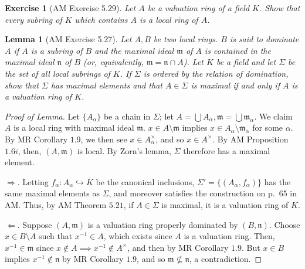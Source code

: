 \documentclass[12pt,letterpaper]{article}
\newtheorem{problem}{Exercise}[section]
\newtheorem*{lemma*}{Lemma}
\theoremstyle{definition}
\theoremstyle{remark}
\numberwithin{figure}{problem}
\numberwithin{equation}{section}
\begin{document}
\begin{problem}[AM Exercise 5.29]
  Let $A$ be a valuation ring of a field $K$. Show that every subring of $K$ which contains $A$ is a local ring of $A$.
\end{problem}
\begin{lemma*}[AM Exercise 5.27]
  Let $A,B$ be two local rings. $B$ is said to \emph{dominate} $A$ if $A$ is a subring of $B$ and the maximal ideal $\mathfrak{m}$ of $A$ is contained in the maximal ideal $\mathfrak{n}$ of $B$ (or, equivalently, $\mathfrak{m} = \mathfrak{n} \cap A$). Let $K$ be a field and let $\Sigma$ be the set of all local subrings of $K$. If $\Sigma$ is ordered by the relation of domination, show that $\Sigma$ has maximal elements and that $A \in \Sigma$ is maximal if and only if $A$ is a valuation ring of $K$.
\end{lemma*}
\begin{proof}[Proof of Lemma]
  Let $\{A_\alpha\}$ be a chain in $\Sigma$; let $A = \bigcup A_\alpha, \mathfrak{m} = \bigcup \mathfrak{m}_\alpha$. We claim $A$ is a local ring with maximal ideal $\mathfrak{m}$. $x \in A \setminus \mathfrak{m}$ implies $x \in A_\alpha \setminus \mathfrak{m}_\alpha$ for some $\alpha$. By MR Corollary $1.9$, we then see $x \in A_\alpha^\times$, and so $x \in A^\times$. By AM Proposition $1.6i$, then, $(A,\mathfrak{m})$ is local. By Zorn's lemma, $\Sigma$ therefore has a maximal element.
  \par $\Rightarrow$. Letting $f_\alpha : A_\alpha \hookrightarrow \overline{K}$ be the canonical inclusions, $\Sigma' = \{(A_\alpha,f_\alpha)\}$ has the same maximal elements as $\Sigma$, and moreover satisfies the construction on p.~$65$ in AM. Thus, by AM Theorem $5.21$, if $A \in \Sigma$ is maximal, it is a valuation ring of $K$.
  \par $\Leftarrow$. Suppose $(A,\mathfrak{m})$ is a valuation ring properly dominated by $(B,\mathfrak{n})$. Choose $x \in B \setminus A$ such that $x^{-1} \in A$, which exists since $A$ is a valuation ring. Then, $x^{-1} \in \mathfrak{m}$ since $x \notin A \implies x^{-1} \notin A^\times$, and then by MR Corollary $1.9$. But $x \in B$ implies $x^{-1} \notin \mathfrak{n}$ by MR Corollary $1.9$, and so $\mathfrak{m} \not\subseteq \mathfrak{n}$, a contradiction.
\end{proof}
\end{document}
